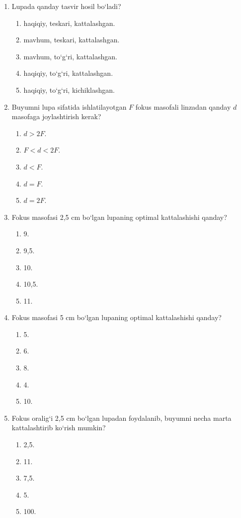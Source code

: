 \begin{enumerate}

\item Lupada qanday tasvir hosil bo‘ladi?
\begin{enumerate}[label=\Alph*)]
\item haqiqiy, teskari, kattalashgan.
\item mavhum, teskari, kattalashgan.
\item mavhum, to‘g‘ri, kattalashgan.
\item haqiqiy, to‘g‘ri, kattalashgan.
\item haqiqiy, to‘g‘ri, kichiklashgan.
\end{enumerate}

\item Buyumni lupa sifatida ishlatilayotgan $F$ fokus masofali linzadan qanday $d$ masofaga joylashtirish kerak?
\begin{enumerate}[label=\Alph*)]
\item $d>2F$.
\item $F<d<2F$.
\item $d<F$.
\item $d=F$.
\item $d=2F$.
\end{enumerate}

\item Fokus masofasi 2,5 cm bo‘lgan lupaning optimal kattalashishi qanday?
\begin{enumerate}[label=\Alph*)]
\item 9.
\item 9,5.
\item 10.
\item 10,5.
\item 11.
\end{enumerate}

\item Fokus masofasi 5 cm bo‘lgan lupaning optimal kattalashishi qanday?
\begin{enumerate}[label=\Alph*)]
\item 5.
\item 6.
\item 8.
\item 4.
\item 10.
\end{enumerate}

\item Fokus oralig‘i 2,5 cm bo‘lgan lupadan foydalanib, buyumni necha marta kattalashtirib ko‘rish mumkin?
\begin{enumerate}[label=\Alph*)]
\item 2,5.
\item 11.
\item 7,5.
\item 5.
\item 100.
\end{enumerate}


\end{enumerate}
